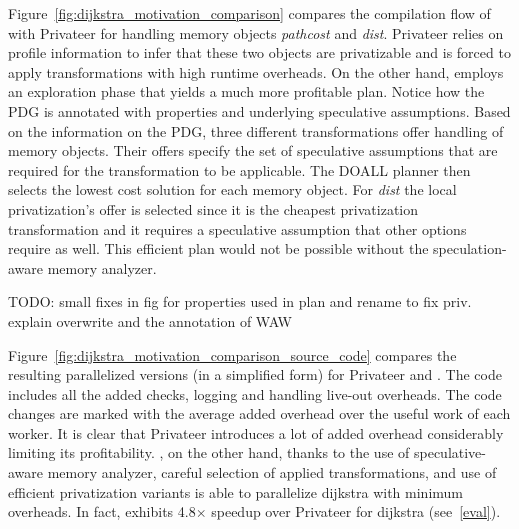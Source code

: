 Figure~\ref{fig:dijkstra_motivation_comparison} compares the
compilation flow of \name with Privateer for handling memory objects
\textit{pathcost} and \textit{dist}.
%
Privateer relies on profile information to infer that these two
objects are privatizable and is forced to apply transformations with
high runtime overheads.
%
On the other hand, \name employs an exploration phase that yields a
much more profitable plan.
Notice how the PDG is annotated with properties and underlying
speculative assumptions.
%
Based on the information on the PDG, three different transformations
offer handling of memory objects. Their offers specify the set of
speculative assumptions that are required for the transformation to be
applicable.
%
%
The DOALL planner then selects the lowest cost solution for each
memory object. For \textit{dist} the local privatization's offer is
selected since it is the cheapest privatization transformation and it
requires a speculative assumption that other options require as well.
%
This efficient plan would not be possible without the
speculation-aware memory analyzer.



TODO: small fixes in fig for properties used in plan and rename to fix
priv. explain overwrite and the annotation of WAW





Figure~\ref{fig:dijkstra_motivation_comparison_source_code} compares
the resulting parallelized versions (in a simplified form) for
Privateer and \namensp. The code includes all the added checks,
logging and handling live-out overheads. The code changes are marked
with the average added overhead over the useful work of each worker.
It is clear that Privateer introduces a lot of added overhead
considerably limiting its profitability. \namensp, on the other hand,
thanks to the use of speculative-aware memory analyzer, careful
selection of applied transformations, and use of efficient
privatization variants is able to parallelize dijkstra with minimum
overheads. In fact, \name exhibits 4.8$\times$ speedup over Privateer
for dijkstra (see~\ref{eval}).


